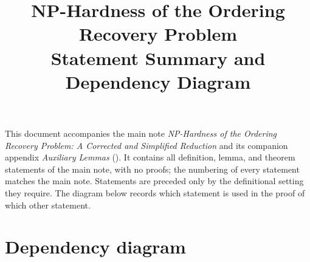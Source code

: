 \documentclass[11pt]{article}
\title{NP-Hardness of the Ordering Recovery Problem\\
\large Statement Summary and Dependency Diagram}
\author{}
\date{}
\begin{document}
\maketitle

\noindent
This document accompanies the main note \emph{NP-Hardness of the Ordering Recovery Problem: A Corrected and Simplified Reduction} and its companion appendix \emph{Auxiliary Lemmas} ().  It contains all definition, lemma, and theorem statements of the main note, with no proofs; the numbering of every statement matches the main note.  Statements are preceded only by the definitional setting they require.  The diagram below records which statement is used in the proof of which other statement.

\section{Dependency diagram}
\end{document}
